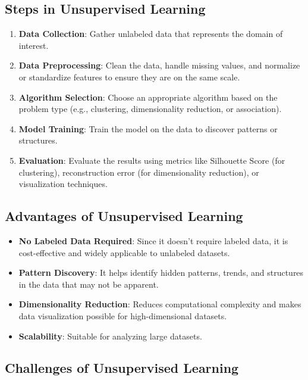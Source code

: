 \subsection*{Steps in Unsupervised Learning}

\begin{enumerate}
    \item \textbf{Data Collection}: Gather unlabeled data that represents the domain of interest.
    \item \textbf{Data Preprocessing}: Clean the data, handle missing values, and normalize or standardize features to ensure they are on the same scale.
    \item \textbf{Algorithm Selection}: Choose an appropriate algorithm based on the problem type (e.g., clustering, dimensionality reduction, or association).
    \item \textbf{Model Training}: Train the model on the data to discover patterns or structures.
    \item \textbf{Evaluation}: Evaluate the results using metrics like Silhouette Score (for clustering), reconstruction error (for dimensionality reduction), or visualization techniques.
\end{enumerate}

\subsection*{Advantages of Unsupervised Learning}

\begin{itemize}
    \item \textbf{No Labeled Data Required}: Since it doesn’t require labeled data, it is cost-effective and widely applicable to unlabeled datasets.
    \item \textbf{Pattern Discovery}: It helps identify hidden patterns, trends, and structures in the data that may not be apparent.
    \item \textbf{Dimensionality Reduction}: Reduces computational complexity and makes data visualization possible for high-dimensional datasets.
    \item \textbf{Scalability}: Suitable for analyzing large datasets.
\end{itemize}

\subsection*{Challenges of Unsupervised Learning}

